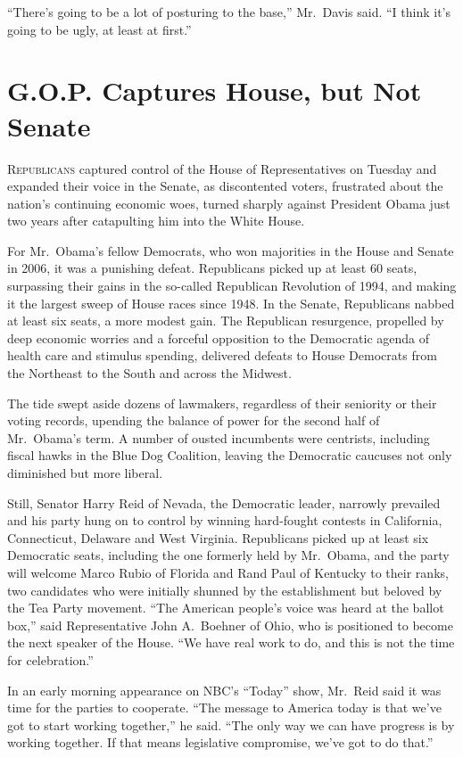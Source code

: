 ﻿\documentclass[12pt]{article}
\begin{document}
``There's going to be a lot of posturing to the base,'' Mr.~Davis said. ``I think it's going to be
ugly, at least at first.''

\section{G.O.P. Captures House, but Not Senate}

\lettrine{R}{epublicans} captured control of the House of Representatives on
Tuesday and expanded their voice in the Senate, as discontented voters, frustrated about the
nation's continuing economic woes, turned sharply against President Obama just two years after
catapulting him into the White House.

For Mr.~Obama's fellow Democrats, who won majorities in the House and Senate in 2006, it was a
punishing defeat. Republicans picked up at least 60 seats, surpassing their gains in the so-called
Republican Revolution of 1994, and making it the largest sweep of House races since 1948. In the
Senate, Republicans nabbed at least six seats, a more modest gain. The Republican resurgence,
propelled by deep economic worries and a forceful opposition to the Democratic agenda of health care
and stimulus spending, delivered defeats to House Democrats from the Northeast to the South and
across the Midwest.

The tide swept aside dozens of lawmakers, regardless of their seniority or their voting records,
upending the balance of power for the second half of Mr.~Obama's term. A number of ousted incumbents
were centrists, including fiscal hawks in the Blue Dog Coalition, leaving the Democratic caucuses
not only diminished but more liberal.

Still, Senator Harry Reid of Nevada, the Democratic leader, narrowly prevailed and his party hung on
to control by winning hard-fought contests in California, Connecticut, Delaware and West Virginia.
Republicans picked up at least six Democratic seats, including the one formerly held by Mr.~Obama,
and the party will welcome Marco Rubio of Florida and Rand Paul of Kentucky to their ranks, two
candidates who were initially shunned by the establishment but beloved by the Tea Party movement.
``The American people's voice was heard at the ballot box,'' said Representative John A.~Boehner of
Ohio, who is positioned to become the next speaker of the House. ``We have real work to do, and this
is not the time for celebration.''

In an early morning appearance on NBC's ``Today'' show, Mr.~Reid said it was time for the parties to
cooperate. ``The message to America today is that we've got to start working together,'' he said.
``The only way we can have progress is by working together. If that means legislative compromise,
we've got to do that.''
\end{document}
